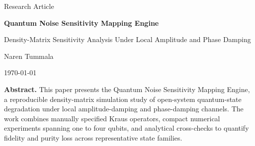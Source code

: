 \begin{titlepage}
\centering

{\Large Research Article\par}
\vspace{1.5cm}

{\Huge \bfseries Quantum Noise Sensitivity Mapping Engine\par}
\vspace{0.8cm}
{\Large Density-Matrix Sensitivity Analysis Under Local Amplitude and Phase Damping\par}
\vspace{2cm}

{\Large Naren Tummala\par}
\vspace{0.5cm}
{\large \today\par}

\vfill

\begin{minipage}{0.88\textwidth}
\centering
\textbf{Abstract.} This paper presents the Quantum Noise Sensitivity Mapping Engine, a reproducible density-matrix simulation study of open-system quantum-state degradation under local amplitude-damping and phase-damping channels. The work combines manually specified Kraus operators, compact numerical experiments spanning one to four qubits, and analytical cross-checks to quantify fidelity and purity loss across representative state families.
\end{minipage}

\vfill

\end{titlepage}
